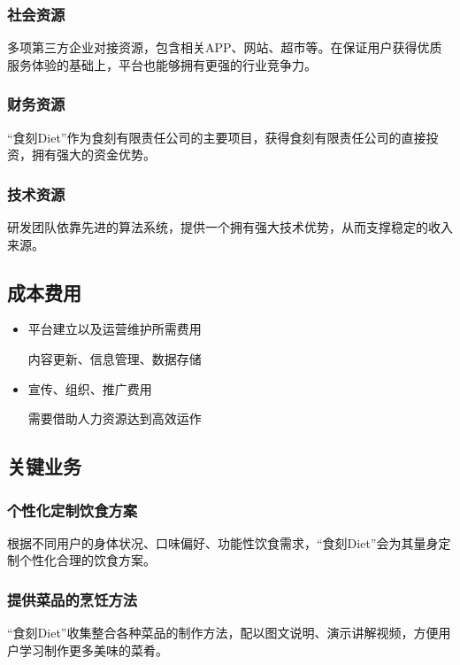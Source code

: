 \documentclass[UTF8,12pt]{ctexart}
\numberwithin{figure}{section}%
\begin{document}
\begin{spacing}{2}
\subsubsection{社会资源}

多项第三方企业对接资源，包含相关APP、网站、超市等。在保证用户获得优质服务体验的基础上，平台也能够拥有更强的行业竞争力。

\subsubsection{财务资源}

“食刻Diet”作为食刻有限责任公司的主要项目，获得食刻有限责任公司的直接投资，拥有强大的资金优势。

\subsubsection{技术资源}

研发团队依靠先进的算法系统，提供一个拥有强大技术优势，从而支撑稳定的收入来源。

\subsection{成本费用}

\begin{itemize}
	\item 平台建立以及运营维护所需费用
	
	内容更新、信息管理、数据存储 
		
	\item 宣传、组织、推广费用
	
	需要借助人力资源达到高效运作
\end{itemize}
\subsection{关键业务}
\subsubsection{个性化定制饮食方案}

根据不同用户的身体状况、口味偏好、功能性饮食需求，“食刻Diet”会为其量身定制个性化合理的饮食方案。

\subsubsection{提供菜品的烹饪方法}

“食刻Diet”收集整合各种菜品的制作方法，配以图文说明、演示讲解视频，方便用户学习制作更多美味的菜肴。


\end{spacing}
\end{document}
